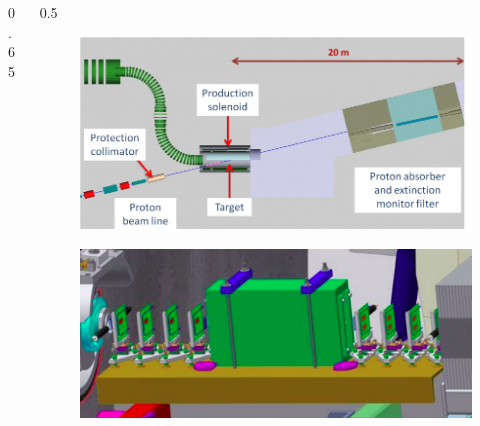 \documentclass{beamer}
\begin{document}
\begin{frame}
\begin{columns}
\begin{column}{0.65\framewidth}
\begin{itemize}
{              }
               \end{itemize}
            \end{column}
            \begin{column}{0.5\framewidth}
                \begin{figure}[!h]
                    \centering
                    \includegraphics[width =\columnwidth]{figures/png/800px-Extinction_filter.png}
                    \label{fig:extintion}
                    \end{figure}
                    \begin{figure}[!h]
                    \centering
                    \includegraphics[width =\columnwidth]{figures/png/Screenshot_20240306_184720.png}
                    \label{fig:extintionmonitor}
                    \end{figure}
            \end{column}
    \end{columns}
\end{frame}
\end{document}
